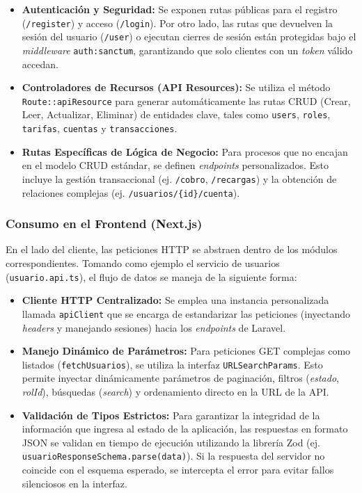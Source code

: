 \documentclass[12pt,letterpaper]{report}
\begin{document}
	\begin{itemize}
		\item \textbf{Autenticación y Seguridad:} Se exponen rutas públicas para el registro (\texttt{/register}) y acceso (\texttt{/login}). Por otro lado, las rutas que devuelven la sesión del usuario (\texttt{/user}) o ejecutan cierres de sesión están protegidas bajo el \textit{middle\-ware} \texttt{auth:sanctum}, garantizando que solo clientes con un \textit{token} válido accedan.
		\item \textbf{Controladores de Recursos (API Resources):} Se utiliza el método \texttt{Route::api\-Resource} para generar automáticamente las rutas CRUD (Crear, Leer, Actualizar, Eliminar) de entidades clave, tales como \texttt{users}, \texttt{roles}, \texttt{tarifas}, \texttt{cuentas} y \texttt{transacciones}.
		\item \textbf{Rutas Específicas de Lógica de Negocio:} Para procesos que no encajan en el modelo CRUD estándar, se definen \textit{end\-points} personalizados. Esto incluye la gestión transaccional (ej. \texttt{/cobro}, \texttt{/recargas}) y la obtención de relaciones complejas (ej. \texttt{/usuarios/\{id\}/cuenta}).
	\end{itemize}
	
	\subsubsection{Consumo en el Frontend (Next.js)}
	En el lado del cliente, las peticiones HTTP se abstraen dentro de los módulos correspondientes. Tomando como ejemplo el servicio de usuarios (\texttt{usuario.api.ts}), el flujo de datos se maneja de la siguiente forma:
	
	\begin{itemize}
		\item \textbf{Cliente HTTP Centralizado:} Se emplea una instancia personalizada llamada \texttt{apiClient} que se encarga de estandarizar las peticiones (inyectando \textit{headers} y manejando sesiones) hacia los \textit{end\-points} de Laravel.
		\item \textbf{Manejo Dinámico de Parámetros:} Para peticiones GET complejas como listados (\texttt{fetchUsuarios}), se utiliza la interfaz \texttt{URL\-Search\-Params}. Esto permite inyectar dinámicamente parámetros de paginación, filtros (\textit{estado}, \textit{rolId}), búsquedas (\textit{search}) y ordenamiento directo en la URL de la API.
		\item \textbf{Validación de Tipos Estrictos:} Para garantizar la integridad de la información que ingresa al estado de la aplicación, las respuestas en formato JSON se validan en tiempo de ejecución utilizando la librería Zod (ej. \texttt{usuario\-Response\-Schema.parse(data)}). Si la respuesta del servidor no coincide con el esquema esperado, se intercepta el error para evitar fallos silenciosos en la interfaz.
	\end{itemize}
	
\end{document}
